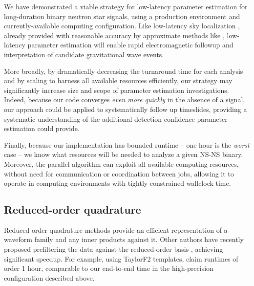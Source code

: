 \label{sec:Discussion}

We have demonstrated a viable strategy for low-latency parameter estimation for long-duration binary neutron star signals, using
a production environment and currently-available computing configuration.   
%
Like low-latency sky localization 
\cite{gwastro-skyloc-Sidery2013,LIGO-2013-WhitePaper-CoordinatedEMObserving}, already provided with reasonable accuracy
by approximate methods like \BS{}, low-latency parameter estimation will enable rapid electromagnetic followup and interpretation of
candidate gravitational wave events. 


%
More broadly, by dramatically decreasing the turnaround time for each analysis and by scaling to harness all available
resources efficiently, our strategy may significantly increase size and scope of parameter estimation investigations.
%
Indeed, because our code converges \emph{even more quickly} in the absence of a signal, our approach could be applied to
systematically follow up timeslides, providing a systematic understanding of the additional detection confidence
parameter estimation could provide. 
%


Finally, because our implementation has bounded runtime -- one hour is the \emph{worst} case -- we know what  resources
will be needed to analyze a given NS-NS binary. Moreover, the parallel algorithm can exploit all available computing
resources, without need for communication or coordination between jobs, allowing it to operate in computing environments
with tightly constrained wallclock time. 


\subsection{Reduced-order quadrature}
Reduced-order quadrature methods provide an efficient representation of a waveform family and any inner products against
it.   Other authors have recently proposed prefiltering the data against the reduced-order basis
\cite{gw-astro-ReducedOrderQuadraturePE-TiglioEtAl2014}, achieving significant speedup.  For example, using TaylorF2
templates, \cite{gw-astro-ReducedOrderQuadraturePE-TiglioEtAl2014} claim runtimes of order 1 hour, comparable to our
end-to-end time in the high-precision configuration described above.

